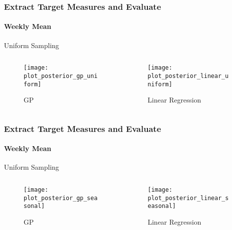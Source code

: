 \documentclass[
	8pt, %
]{beamer}
\begin{document}
\begin{frame}
	\frametitle{Extract Target Measures and Evaluate}
	\framesubtitle{Weekly Mean} %

	Uniform Sampling
	\begin{columns}[c] %
		\begin{column}{0.45\textwidth} %
				\begin{figure}
					\texttt{[image: plot\_posterior\_gp\_uniform]}
					\caption{GP}

				\end{figure}
		\end{column}
		\begin{column}{0.5\textwidth} %
				\begin{figure}
					\texttt{[image: plot\_posterior\_linear\_uniform]}
					\caption{Linear Regression}
				\end{figure}

		\end{column}
	\end{columns}



\end{frame}



\begin{frame}
	\frametitle{Extract Target Measures and Evaluate}
	\framesubtitle{Weekly Mean} %

	Uniform Sampling
	\begin{columns}[c] %
		\begin{column}{0.45\textwidth} %
				\begin{figure}
					\texttt{[image: plot\_posterior\_gp\_seasonal]}
					\caption{GP}

				\end{figure}
		\end{column}
		\begin{column}{0.5\textwidth} %
				\begin{figure}
					\texttt{[image: plot\_posterior\_linear\_seasonal]}
					\caption{Linear Regression}
				\end{figure}

		\end{column}
	\end{columns}



\end{frame}
\end{document}
